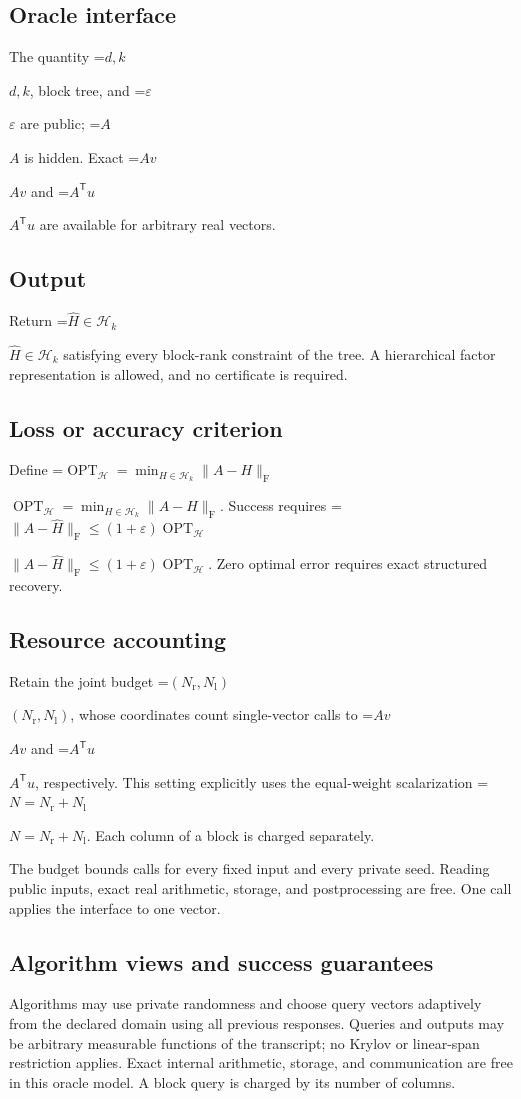 \documentclass[10pt,a4paper]{article}
\newcommand{\AtlasMath}[1]{\par\begingroup\centering\setbox0=\hbox{$\displaystyle #1$}\ifdim\wd0>1.4\linewidth\typeout{ATLAS WIDE FORMULA: \the\wd0}\fi\ifdim\wd0>\linewidth\resizebox{\linewidth}{!}{\box0}\else\box0\fi\par\endgroup}
\newcommand{\AtlasInlineMath}[1]{\begingroup\setbox0=\hbox{$#1$}\ifdim\wd0>.4\linewidth\endgroup\AtlasMath{#1}\else\endgroup$#1$\fi}
\begin{document}
\subsection{Oracle interface}
The quantity \AtlasInlineMath{d,k}, block tree, and \AtlasInlineMath{\varepsilon} are public; \AtlasInlineMath{A} is hidden. Exact \AtlasInlineMath{Av} and \AtlasInlineMath{A^{\mathsf T}u} are available for arbitrary real vectors.

\subsection{Output}
Return \AtlasInlineMath{\widehat{H}\in\mathcal{H}_k} satisfying every block-rank constraint of the tree. A hierarchical factor representation is allowed, and no certificate is required.

\subsection{Loss or accuracy criterion}
Define \AtlasInlineMath{\operatorname{OPT}_{\mathcal{H}}=\min_{H\in\mathcal{H}_k}\|A-H\|_{\mathrm{F}}}. Success requires \AtlasInlineMath{\|A-\widehat{H}\|_{\mathrm{F}}\le(1+\varepsilon)\operatorname{OPT}_{\mathcal{H}}}. Zero optimal error requires exact structured recovery.

\subsection{Resource accounting}
Retain the joint budget \AtlasInlineMath{(N_{\mathrm{r}},N_{\mathrm{l}})}, whose coordinates count single-vector calls to \AtlasInlineMath{Av} and \AtlasInlineMath{A^{\mathsf T}u}, respectively. This setting explicitly uses the equal-weight scalarization \AtlasInlineMath{N=N_{\mathrm{r}}+N_{\mathrm{l}}}. Each column of a block is charged separately.

The budget bounds calls for every fixed input and every private seed. Reading public inputs, exact real arithmetic, storage, and postprocessing are free. One call applies the interface to one vector.

\subsection{Algorithm views and success guarantees}
Algorithms may use private randomness and choose query vectors adaptively from the declared domain using all previous responses. Queries and outputs may be arbitrary measurable functions of the transcript; no Krylov or linear-span restriction applies. Exact internal arithmetic, storage, and communication are free in this oracle model. A block query is charged by its number of columns.
\end{document}
